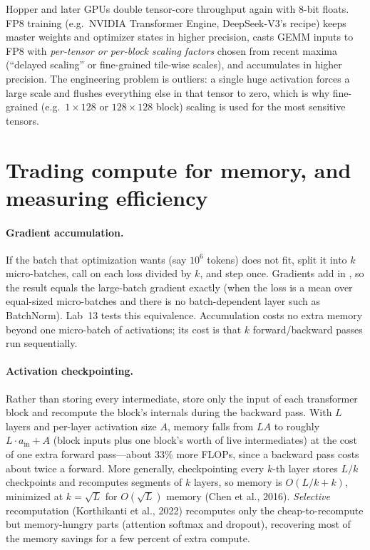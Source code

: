 \begin{systemslens}[FP8 training]
Hopper and later GPUs double tensor-core throughput again with 8-bit floats. FP8 training
(e.g.\ NVIDIA Transformer Engine, DeepSeek-V3's recipe) keeps master weights and optimizer
states in higher precision, casts GEMM inputs to FP8 with \emph{per-tensor or per-block scaling
factors} chosen from recent maxima (``delayed scaling'' or fine-grained tile-wise scales), and
accumulates in higher precision. The engineering problem is outliers: a single huge activation
forces a large scale and flushes everything else in that tensor to zero, which is why
fine-grained (e.g.\ $1\times128$ or $128\times128$ block) scaling is used for the most
sensitive tensors.
\end{systemslens}

\section{Trading compute for memory, and measuring efficiency}\label{sec:pretrain:efficiency}

\paragraph{Gradient accumulation.} If the batch that optimization wants (say $10^6$ tokens) does
not fit, split it into $k$ micro-batches, call  on each loss divided by $k$,
and step once. Gradients add in , so the result equals the large-batch gradient
exactly (when the loss is a mean over equal-sized micro-batches and there is no batch-dependent
layer such as BatchNorm). Lab~13 tests this equivalence. Accumulation costs no extra memory
beyond one micro-batch of activations; its cost is that $k$ forward/backward passes run
sequentially.

\paragraph{Activation checkpointing.} Rather than storing every intermediate, store only the
input of each transformer block and recompute the block's internals during the backward pass.
With $L$ layers and per-layer activation size $A$, memory falls from $LA$ to roughly
$L\cdot a_{\text{in}} + A$ (block inputs plus one block's worth of live intermediates) at the
cost of one extra forward pass---about 33\% more FLOPs, since a backward pass costs about twice
a forward. More generally, checkpointing every $k$-th layer stores $L/k$ checkpoints and
recomputes segments of $k$ layers, so memory is $O(L/k + k)$, minimized at $k=\sqrt L$ for
$O(\sqrt L)$ memory (Chen et al., 2016). \emph{Selective} recomputation (Korthikanti et al.,
2022) recomputes only the cheap-to-recompute but memory-hungry parts (attention softmax and
dropout), recovering most of the memory savings for a few percent of extra compute.

